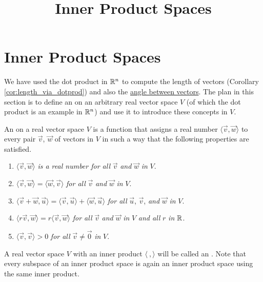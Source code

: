 \documentclass{ximera}
\title{Inner Product Spaces} \license{CC BY-NC-SA 4.0}
\begin{document}
\begin{abstract}
 \end{abstract}
\maketitle

\section*{Inner Product Spaces}

We have used the dot product in $\mathbb{R}^n$ to compute the length of vectors (Corollary \ref{cor:length_via_dotprod}) and also the \href{https://ximera.osu.edu/oerlinalg/LinearAlgebra/VEC-0060/main}{angle between vectors}. The plan in this section is to define an  on an arbitrary real vector space $V$ (of which the dot product is an example in $\mathbb{R}^n$) and use it to introduce these concepts in $V$.

\begin{definition}\label{def:innerproductspace}
An  on a real vector space $V$ is a function that assigns a real number $\langle\vec{v}, \vec{w}\rangle$ to every pair $\vec{v}$, $\vec{w}$ of vectors in $V$ in such a way that the following properties are satisfied.

\begin{enumerate}
\item\label{prop:inner_prod_1}  $\langle\vec{v}, \vec{w}\rangle$ \textit{is a real number for all} $\vec{v}$ \textit{and} $\vec{w}$ \textit{in} $V$.

\item\label{prop:inner_prod_2}  $\langle\vec{v}, \vec{w}\rangle = \langle\vec{w}, \vec{v}\rangle$ \textit{for all} $\vec{v}$ \textit{and} $\vec{w}$ \textit{in} $V$.

\item\label{prop:inner_prod_3}  $\langle\vec{v} + \vec{w}, \vec{u}\rangle = \langle\vec{v}, \vec{u}\rangle + \langle\vec{w}, \vec{u}\rangle$ \textit{for all} $\vec{u}$, $\vec{v}$, \textit{and} $\vec{w}$ \textit{in} $V$.

\item\label{prop:inner_prod_4} $\langle r\vec{v}, \vec{w}\rangle = r\langle\vec{v}, \vec{w}\rangle$ \textit{for all} $\vec{v}$ \textit{and} $\vec{w}$ \textit{in} $V$ \textit{and all} $r$ \textit{in} $\mathbb{R}$.

\item\label{prop:inner_prod_5}  $\langle\vec{v}, \vec{v}\rangle > 0$ \textit{for all} $\vec{v} \neq \vec{0}$ \textit{in} $V$.

\end{enumerate}
\end{definition}
A real vector space $V$ with an inner product $\langle\ , \rangle$ will be called an .  Note that every subspace of an inner product space is again an inner product space using the same inner product.
\end{document}
